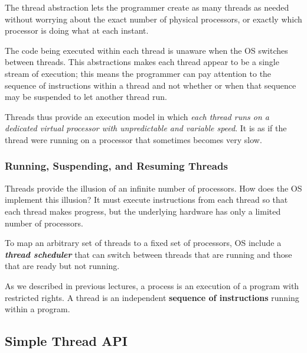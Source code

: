 \documentclass{article}
\begin{document}
The thread abstraction lets the programmer create as many threads as needed without worrying about the exact number of physical processors, or exactly which processor is doing what at each instant.

The code being executed within each thread is unaware when the OS switches between threads. This abstractions makes each thread appear to be a single stream of execution; this means the programmer can pay attention to the sequence of instructions within a thread and not whether or when that sequence may be suspended to let another thread run.

Threads thus provide an execution model in which \textit{each thread runs on a dedicated virtual processor with unpredictable and variable speed}. It is as if the thread were running on a processor that sometimes becomes very slow.

\subsubsection{Running, Suspending, and Resuming Threads}
Threads provide the illusion of an infinite number of processors. How does the OS implement this illusion? It must execute instructions from each thread so that each thread makes progress, but the underlying hardware has only a limited number of processors.

To map an arbitrary set of threads to a fixed set of processors, OS include a \textit{\textbf{thread scheduler}} that can switch between threads that are running and those that are ready but not running.

\begin{example}
    As we described in previous lectures, a process is an execution of a program with restricted rights. A thread is an independent \textbf{sequence of instructions} running within a program.
\end{example}

\subsection{Simple Thread API}
\end{document}
